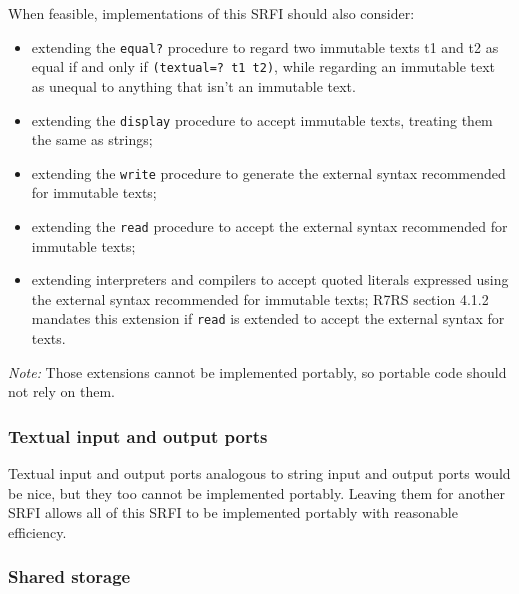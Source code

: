 
When feasible, implementations of this SRFI should also consider:

\begin{itemize}
\tightlist
\item
  extending the \texttt{equal?} procedure to regard two immutable texts
  t1 and t2 as equal if and only if \texttt{(textual=?\ t1\ t2)}, while
  regarding an immutable text as unequal to anything that isn't an
  immutable text.
\item
  extending the \texttt{display} procedure to accept immutable texts,
  treating them the same as strings;
\item
  extending the \texttt{write} procedure to generate the external syntax
  recommended for immutable texts;
\item
  extending the \texttt{read} procedure to accept the external syntax
  recommended for immutable texts;
\item
  extending interpreters and compilers to accept quoted literals
  expressed using the external syntax recommended for immutable texts;
  R7RS section 4.1.2 mandates this extension if \texttt{read} is
  extended to accept the external syntax for texts.
\end{itemize}

\emph{Note:} Those extensions cannot be implemented portably, so
portable code should not rely on them. 

\subsubsection{{Textual input and output ports}}\label{textual-input-and-output-ports}

Textual input and output ports analogous to string input and output
ports would be nice, but they too cannot be implemented portably.
Leaving them for another SRFI allows all of this SRFI to be implemented
portably with reasonable efficiency.


\subsubsection{{Shared storage}}\label{shared-storage}


